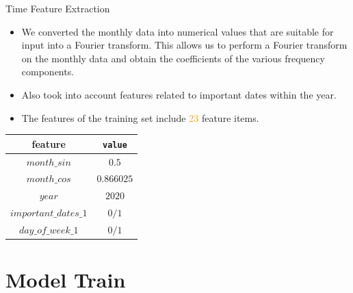 \documentclass[
 size=14pt,
 paper=smartboard,  %
 mode=present, 		%
 display=slides, 	%
 style=tuliplab,  	%
 pauseslide,
 fleqn,leqno]{powerdot}
\begin{document}
\begin{slide}[toc=,bm=]{Time Feature Extraction}
		\begin{itemize}
	\item
We converted the monthly data into numerical values that are suitable for input
into a Fourier transform. This allows us to perform a Fourier transform on the monthly data and obtain the coefficients of the various frequency components.
	\item
	Also took into account features related to important dates within the year.
	\item
	The features of the training set include \textcolor{orange} {23}  feature items.
	\end{itemize}
	\begin{center}
	\begin{tabular}{c| c }
		\toprule
		feature & \texttt{value}  \\
		\midrule
		$month\_sin$
		&  {$0.5$}  \\
		$month\_cos$
		&  {$0.866025$}  \\
		$year$
		&  {$2020$}  \\
		$important\_dates\_1$
		&  {$0/1$}  \\
		$day\_of\_week\_1$
		&  {$0/1$}  \\
		\bottomrule
	\end{tabular}
\end{center}



\end{slide}


\section{Model Train}
\end{document}
